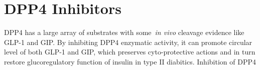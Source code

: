 \section{DPP4 Inhibitors}
DPP4 has a large array of substrates with some~\textit{in vivo} cleavage evidence like GLP-1 and GIP. By inhibiting DPP4 enzymatic activity, it can promote circular level of both GLP-1 and GIP, which preserves cyto-protective actions and in turn restore glucoregulatory function of insulin in type II diabitics. Inhibition of DPP4